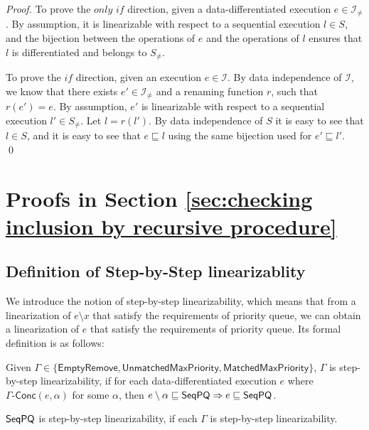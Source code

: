 \DataDifferentiatedisEnoughforPQ*

\begin {proof}

To prove the $\textit{only if}$ direction, given a data-differentiated execution $e \in \mathcal{I}_{\neq}$. By assumption, it is linearizable with respect to a sequential execution $l \in S$, and the bijection between the operations of $e$ and the operations of $l$ ensures that $l$ is differentiated and belongs to $S_{\neq}$.

To prove the $\textit{if}$ direction, given an execution $e \in \mathcal{I}$. By data independence of $\mathcal{I}$, we know that there exists $e' \in \mathcal{I}_{\neq}$ and a renaming function $r$, such that $r(e') = e$. By assumption, $e'$ is linearizable with respect to a sequential execution $l' \in S_{\neq}$. Let $l=r(l')$. By data independence of $S$ it is easy to see that $l \in S$, and it is easy to see that $e \sqsubseteq l$  using the same bijection used for $e' \sqsubseteq l'$. \qed
\end {proof}





\section{Proofs in Section \ref{sec:checking inclusion by recursive procedure}}
\label{sec:appendix in section checking lnclusion by recursive procedure}




\subsection{Definition of Step-by-Step linearizablity}
\label{sec:appendix definition of step-by-step linearizability}


We introduce the notion of step-by-step linearizability, which means that from a linearization of $e \setminus x$ that satisfy the requirements of priority queue, we can obtain a linearization of $e$ that satisfy the requirements of priority queue. Its formal definition is as follows:

\begin{definition}\label{def:step-by-step linearizability}
Given $\Gamma\in \{\mathsf{EmptyRemove}, \mathsf{UnmatchedMaxPriority}, \mathsf{MatchedMaxPriority}\}$, $\Gamma$ is step-by-step linearizability, if for each data-differentiated execution $e$ where $\Gamma\mathsf{\text{-}Conc}(e,\alpha)$ for some $\alpha$, then $e \setminus \alpha \sqsubseteq \mathsf{SeqPQ} \Rightarrow e \sqsubseteq \mathsf{SeqPQ}$.

$\mathsf{SeqPQ}$ is step-by-step linearizability, if each $\Gamma$ is step-by-step linearizability.
\end{definition}

